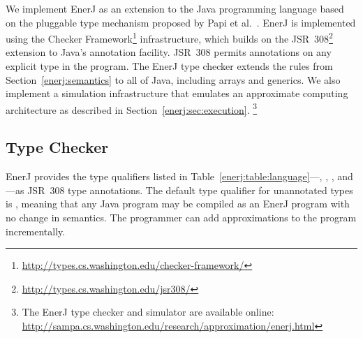 We implement EnerJ as an extension to the Java
programming language based on the
pluggable type mechanism proposed by Papi et al.~\cite{pap2008}.
EnerJ is implemented using the
Checker Framework\footnote{\url{http://types.cs.washington.edu/checker-framework/}}
infrastructure,
which builds on the
JSR~308\footnote{\url{http://types.cs.washington.edu/jsr308/}}
extension to Java's annotation facility. JSR~308 permits annotations on
any explicit type in the program.
The EnerJ type checker extends the rules from Section~\ref{enerj:semantics} to all of
Java, including arrays and generics.
We also implement a simulation infrastructure that emulates an
approximate computing architecture as described in Section~\ref{enerj:sec:execution}.
\footnote{The EnerJ type checker and simulator
are available online:
\url{http://sampa.cs.washington.edu/research/approximation/enerj.html}
}

\subsection{Type Checker}
\label{enerj:checker}
EnerJ provides the type qualifiers listed
in Table~\ref{enerj:table:language}---, ,
, and ---as JSR~308 type annotations.
The default type qualifier for unannotated types is , meaning
that any Java program may be compiled as an EnerJ program with no change in
semantics. The programmer can add approximations to the
program incrementally.




